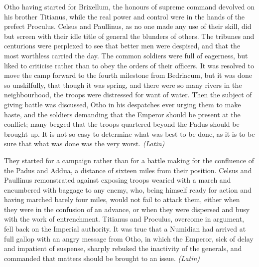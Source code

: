 
Otho having started for Brixellum, the honours of supreme command devolved on his brother Titianus, while the real power and control were in the hands of the prefect Proculus. Celsus and Paullinus, as no one made any use of their skill, did but screen with their idle title of general the blunders of others. The tribunes and centurions were perplexed to see that better men were despised, and that the most worthless carried the day. The common soldiers were full of eagerness, but liked to criticise rather than to obey the orders of their officers. It was resolved to move the camp forward to the fourth milestone from Bedriacum, but it was done so unskilfully, that though it was spring, and there were so many rivers in the neighbourhood, the troops were distressed for want of water. Then the subject of giving battle was discussed, Otho in his despatches ever urging them to make haste, and the soldiers demanding that the Emperor should be present at the conflict; many begged that the troops quartered beyond the Padus should be brought up. It is not so easy to determine what was best to be done, as it is to be sure that what was done was the very worst. \emph{(Latin)}


They started for a campaign rather than for a battle making for the confluence of the Padus and Addua, a distance of sixteen miles from their position. Celsus and Paullinus remonstrated against exposing troops wearied with a march and encumbered with baggage to any enemy, who, being himself ready for action and having marched barely four miles, would not fail to attack them, either when they were in the confusion of an advance, or when they were dispersed and busy with the work of entrenchment. Titianus and Proculus, overcome in argument, fell back on the Imperial authority. It was true that a Numidian had arrived at full gallop with an angry message from Otho, in which the Emperor, sick of delay and impatient of suspense, sharply rebuked the inactivity of the generals, and commanded that matters should be brought to an issue. \emph{(Latin)}


